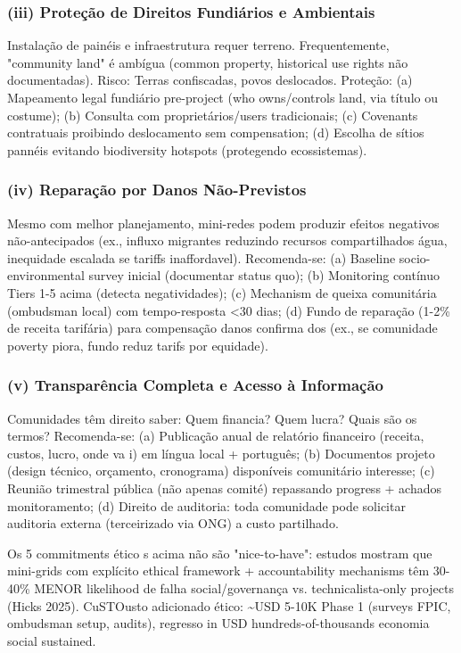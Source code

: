 \documentclass[12pt, a4paper]{article}
\begin{document}
\subsubsection{(iii) Proteção de Direitos Fundiários e Ambientais}
Instalação de painéis e infraestrutura requer terreno. Frequentemente, "community land" é ambígua (common property, historical use rights não documentadas). Risco: Terras confiscadas, povos deslocados. Proteção: (a) Mapeamento legal fundiário pre-project (who owns/controls land, via título ou costume); (b) Consulta com proprietários/users tradicionais; (c) Covenants contratuais proibindo deslocamento sem compensation; (d) Escolha de sítios pannéis evitando biodiversity hotspots (protegendo ecossistemas).

\subsubsection{(iv) Reparação por Danos Não-Previstos}
Mesmo com melhor planejamento,  mini-redes podem produzir efeitos negativos não-antecipados (ex., influxo migrantes reduzindo recursos compartilhados água, inequidade escalada se tariffs inaffordavel). Recomenda-se: (a) Baseline socio-environmental survey inicial (documentar status quo); (b) Monitoring contínuo Tiers 1-5 acima (detecta negatividades); (c) Mechanism de queixa comunitária (ombudsman local) com tempo-resposta <30 dias; (d) Fundo de reparação (1-2\% de receita tarifária) para compensação danos confirma dos (ex., se comunidade poverty piora, fundo reduz tarifs por equidade).

\subsubsection{(v) Transparência Completa e Acesso à Informação}
Comunidades têm direito saber: Quem financia? Quem lucra? Quais são os termos? Recomenda-se: (a) Publicação anual de relatório financeiro (receita, custos, lucro, onde va i) em língua local + português; (b) Documentos projeto (design técnico, orçamento, cronograma) disponíveis comunitário interesse; (c) Reunião trimestral pública (não apenas comité) repassando progress + achados monitoramento; (d) Direito de auditoria: toda comunidade pode solicitar auditoria externa (terceirizado via ONG) a custo partilhado.

Os 5 commitments ético s acima não são "nice-to-have": estudos mostram que mini-grids com explícito ethical framework + accountability mechanisms têm 30-40\% MENOR likelihood de falha social/governança vs. technicalista-only projects (Hicks 2025). CuSTOusto adicionado ético: \textasciitilde{}USD 5-10K Phase 1 (surveys FPIC, ombudsman setup, audits), regresso in USD hundreds-of-thousands economia social sustained.
\end{document}
